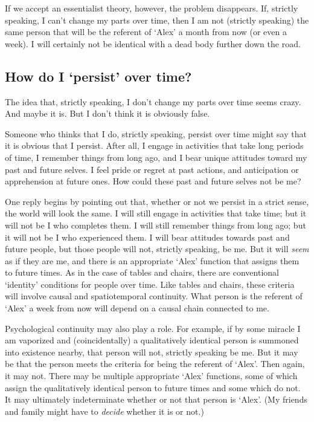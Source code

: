 \documentclass[11pt]{article}
\begin{document}
\begin{spacing}{1.5}
If we accept an essentialist theory, however, the problem disappears.
If, strictly speaking, I can't change my parts over time, then I am
not (strictly speaking) the same person that will be the referent of
`Alex' a month from now (or even a week).  I will certainly not be
identical with a dead body further down the road.

\subsection{How do I `persist' over time?}
\label{person-persist}
The idea that, strictly speaking, I don't change my parts over time
seems crazy.  And maybe it is.  But I don't think it is obviously
false.

Someone who thinks that I do, strictly speaking, persist over time
might say that it is obvious that I persist.  After all, I engage in
activities that take long periods of time, I remember things from long
ago, and I bear unique attitudes toward my past and future selves.  I
feel pride or regret at past actions, and anticipation or apprehension
at future ones.  How could these past and future selves not be me?

One reply begins by pointing out that, whether or not we persist in a
strict sense, the world will look the same.  I will still engage in
activities that take time; but it will not be I who completes them.  I
will still remember things from long ago; but it will not be I who
experienced them.  I will bear attitudes towards past and future
people, but those people will not, strictly speaking, be me.  But it
will {\em seem} as if they are me, and there is an appropriate `Alex'
function that assigns them to future times.  As in the case of tables
and chairs, there are conventional `identity' conditions for people
over time.  Like tables and chairs, these criteria will involve causal
and spatiotemporal continuity.  What person is the referent of `Alex'
a week from now will depend on a causal chain connected to me.

Psychological continuity may also play a role.  For example, if by
some miracle I am vaporized and (coincidentally) a qualitatively
identical person is summoned into existence nearby, that person will
not, strictly speaking be me.  But it may be that the person meets the
criteria for being the referent of `Alex'.  Then again, it may not.
There may be multiple appropriate `Alex' functions, some of which
assign the qualitatively identical person to future times and some
which do not.  It may ultimately indeterminate whether or not that
person is `Alex'.  (My friends and family might have to {\em decide}
whether it is or not.)


\end{spacing}
\end{document}

